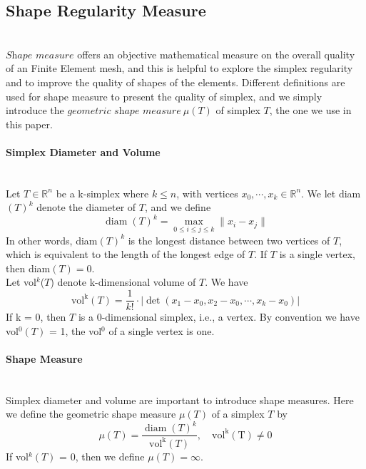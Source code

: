 \subsection{Shape Regularity Measure}\mbox{}\\
    $\textit{Shape measure}$ offers an objective mathematical measure on the overall quality of an Finite Element mesh, and this is helpful to explore the simplex regularity and to improve the quality of shapes of the elements. Different definitions are used for shape measure to present the quality of simplex, and we simply introduce the $\textit{geometric shape measure} ~\mu({T})$ of simplex ${T}$,  the one we use in this paper.

    \paragraph{Simplex Diameter and Volume}\mbox{}\\
    Let ${T} \in\mathbb{R}^n$ be a k-simplex where $k \leqslant n$, with vertices ${x}_0, \cdots, {x}_k \in\mathbb{R}^n$. We let diam$({T})^k$ denote the diameter of ${T}$, and we define
    \begin{equation*}
    \operatorname{diam}({T})^k = \max_{0\leqslant i\leqslant j\leqslant k} \| x_i - x_j \|
    \end{equation*}
    In other words, diam$({T})^k$ is the longest distance between two vertices of ${T}$, which is equivalent to the length of the longest edge of ${T}$. If ${T}$ is a single vertex, then diam$({T}) = 0$.\\

    \noindent
    Let vol$^k$(${T}$) denote k-dimensional volume of ${T}$. We have
    \begin{equation*}
    \operatorname{vol^k} ({T}) = \frac{1}{k!}\cdot|\det(x_1-x_0, x_2-x_0,\cdots, x_k-x_0)|
    \end{equation*}
    \noindent
    If k = 0, then ${T}$ is a 0-dimensional simplex, i.e., a vertex. By convention we have vol$^0 ({T})$ = 1, the vol$^0$ of a single vertex is one.

    
    \paragraph{Shape Measure}\mbox{}\\
    Simplex diameter and volume are important to introduce shape measures. Here we define the {geometric shape measure} $\mu({{T}})$ of a simplex ${T}$ by
    \begin{equation*}
    \mu({{T}}) = \frac{\operatorname{diam}({T})^k}{\operatorname{vol^k}({T})}, \quad\operatorname{vol^k(T) \neq 0}
    \end{equation*}
    If vol$^k(T)$ = 0, then we define $\mu({{T}}) = \infty$.\\
    
